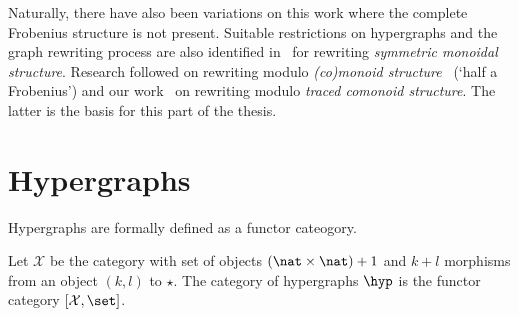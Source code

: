 
Naturally, there have also been variations on this work where the complete
Frobenius structure is not present.
Suitable restrictions on hypergraphs and the graph rewriting process are also
identified in~\cite{bonchi2016rewriting} for rewriting
\emph{symmetric monoidal structure}.
Research followed on rewriting modulo
\emph{(co)monoid structure}~\cite{milosavljevic2023string} (`half a Frobenius')
and our work~\cite{ghica2023rewriting} on rewriting modulo
\emph{traced comonoid structure}.
The latter is the basis for this part of the thesis.

\section{Hypergraphs}

Hypergraphs are formally defined as a functor cateogory.


\begin{definition}[Hypergraph]
    Let \(\mathcal{X}\) be the category with set of objects
    \((\nat \times \nat) + 1\) and \(k + l\) morphisms from an object
    \((k, l)\) to \(\star\).
    The category of hypergraphs \(\hyp\) is the functor category
    \([\mathcal{X}, \set]\).
\end{definition}

